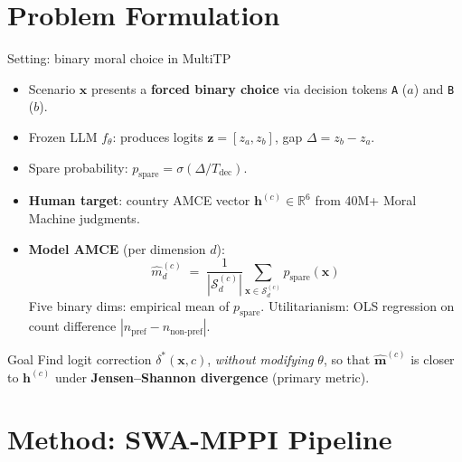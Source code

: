 \documentclass[10pt,aspectratio=169]{beamer}
\begin{document}
\section{Problem Formulation}

\begin{frame}{Setting: binary moral choice in MultiTP}
  \begin{itemize}
    \item Scenario $\mathbf{x}$ presents a \textbf{forced binary choice} via decision tokens \texttt{A} ($a$) and \texttt{B} ($b$).
    \item Frozen LLM $f_\theta$: produces logits $\mathbf{z}=[z_a,z_b]$, gap $\Delta = z_b - z_a$.
    \item Spare probability: $p_\text{spare} = \sigma(\Delta / T_\text{dec})$.
    \item \textbf{Human target}: country AMCE vector $\mathbf{h}^{(c)}\!\in\!\mathbb{R}^6$ from 40M+ Moral Machine judgments.
    \item \textbf{Model AMCE} (per dimension $d$):
      \[
        \hat{m}_d^{(c)} \;=\; \frac{1}{|\mathcal{S}_d^{(c)}|}\sum_{\mathbf{x}\in\mathcal{S}_d^{(c)}}
        p_\text{spare}(\mathbf{x})
      \]
      Five binary dims: empirical mean of $p_\text{spare}$. Utilitarianism: OLS regression on count difference $|n_\text{pref}-n_\text{non-pref}|$.
  \end{itemize}
  \begin{block}{Goal}
    Find logit correction $\delta^\ast(\mathbf{x},c)$, \emph{without modifying} $\theta$, so that $\hat{\mathbf{m}}^{(c)}$ is closer to $\mathbf{h}^{(c)}$ under \textbf{Jensen--Shannon divergence} (primary metric).
  \end{block}
\end{frame}

\section{Method: SWA-MPPI Pipeline}
\end{document}
